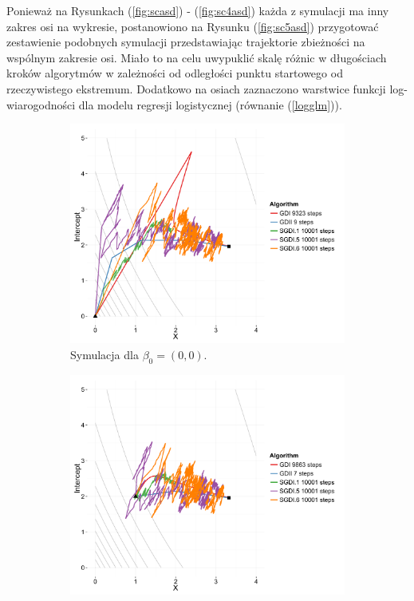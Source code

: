 \newpage

Ponieważ na Rysunkach (\ref{fig:scasd}) - (\ref{fig:sc4asd}) każda z symulacji ma inny zakres osi na wykresie, postanowiono na Rysunku (\ref{fig:sc5asd}) przygotować zestawienie podobnych symulacji przedstawiając trajektorie zbieżności na wspólnym zakresie osi. Miało to na celu uwypuklić skalę różnic w długościach kroków algorytmów w zależności od odległości punktu startowego od rzeczywistego ekstremum. Dodatkowo na osiach zaznaczono warstwice funkcji log-wiarogodności dla modelu regresji logistycznej (równanie (\ref{logglm})).

\begin{figure}[h!]
  \begin{center}
   \begin{subfigure}[h!]{0.45\textwidth}
     \includegraphics[width=\textwidth]{Obrazki/contour_00.pdf}
     \caption{Symulacja dla $\beta_0 = (0,0)$.}
   \end{subfigure}
   \begin{subfigure}[h!]{0.45\textwidth}
        \includegraphics[width=\textwidth]{Obrazki/contour_2_1.pdf}

\end{subfigure}
\end{center}
\end{figure}
